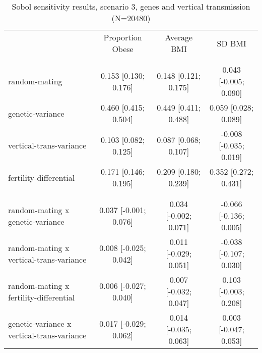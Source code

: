 
    \begin{table}[htp]
    \renewcommand{\arraystretch}{1.3}
    \setlength{\tabcolsep}{3pt}
    \caption{Sobol sensitivity results, scenario 3, genes and vertical transmission (N=20480)}
    \label{tab:sobol-snp-vt}
    \footnotesize
    \centering
    \begin{threeparttable}
    \begin{tabular}{lccc}
    \hline
    \addlinespace
    & Proportion Obese & Average BMI & SD BMI \\
    \addlinespace
    \hline
    \addlinespace
    \multicolumn{4}{l}{\textbf{Scenario 3 (genes and vertical transmission)}} \\
    \addlinespace[6pt]
    \multicolumn{4}{l}{\hspace{1em} S1} \\
\hspace{1.5em} random-mating & 0.153 [0.130; 0.176]   & 0.148 [0.121; 0.175]   & 0.043 [-0.005; 0.090] \\
	  \hspace{1.5em} genetic-variance & 0.460 [0.415; 0.504]   & 0.449 [0.411; 0.488]   & 0.059 [0.028; 0.089] \\
	  \hspace{1.5em} vertical-trans-variance & 0.103 [0.082; 0.125]   & 0.087 [0.068; 0.107]   & -0.008 [-0.035; 0.019] \\
	  \hspace{1.5em} fertility-differential & 0.171 [0.146; 0.195]   & 0.209 [0.180; 0.239]   & 0.352 [0.272; 0.431] \\
	 \\
    \addlinespace[12pt]
    \multicolumn{4}{l}{\hspace{1em} S2} \\ 
\hspace{1.5em} random-mating x genetic-variance & 0.037 [-0.001; 0.076]   & 0.034 [-0.002; 0.071]   & -0.066 [-0.136; 0.005] \\
	  \hspace{1.5em} random-mating x vertical-trans-variance & 0.008 [-0.025; 0.042]   & 0.011 [-0.029; 0.051]   & -0.038 [-0.107; 0.030] \\
	  \hspace{1.5em} random-mating x fertility-differential & 0.006 [-0.027; 0.040]   & 0.007 [-0.032; 0.047]   & 0.103 [-0.003; 0.208] \\
	  \hspace{1.5em} genetic-variance x vertical-trans-variance & 0.017 [-0.029; 0.062]   & 0.014 [-0.035; 0.063]   & 0.003 [-0.047; 0.053] \\

\end{tabular}
\end{threeparttable}
\end{table}
